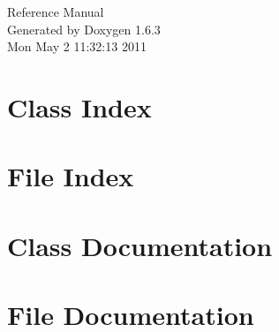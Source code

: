 \documentclass[a4paper]{book}
\begin{document}
\hypersetup{pageanchor=false}
\begin{titlepage}
\vspace*{7cm}
\begin{center}
{\Large Reference Manual}\\
\vspace*{1cm}
{\large Generated by Doxygen 1.6.3}\\
\vspace*{0.5cm}
{\small Mon May 2 11:32:13 2011}\\
\end{center}
\end{titlepage}
\clearemptydoublepage
{}
\tableofcontents
\clearemptydoublepage
{}
\hypersetup{pageanchor=true}
\chapter{Class Index}

\chapter{File Index}

\chapter{Class Documentation}








\chapter{File Documentation}















\printindex
\end{document}
